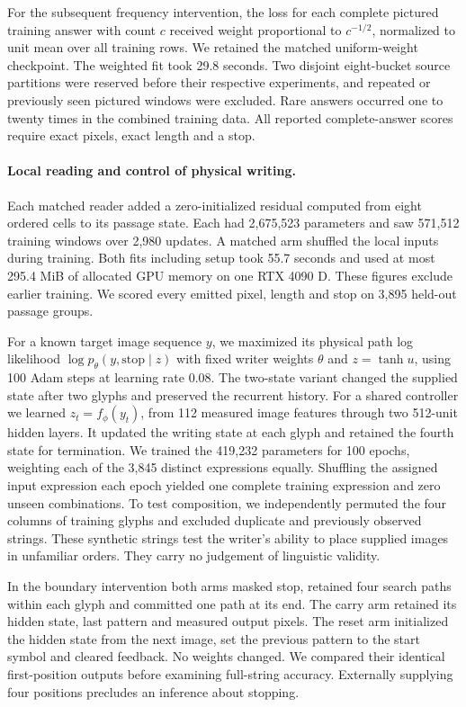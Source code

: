 \documentclass[12pt,a4paper]{article}
\providecommand{\DIFadd}[1]{{\protect\color{blue} \sf #1}} %
\begin{document}
\DIFadd{For the subsequent frequency intervention, the loss for each complete pictured training answer with count $c$ received weight proportional to $c^{-1/2}$, normalized to unit mean over all training rows. We retained the matched uniform-weight checkpoint. The weighted fit took 29.8 seconds. Two disjoint eight-bucket source partitions were reserved before their respective experiments, and repeated or previously seen pictured windows were excluded. Rare answers occurred one to twenty times in the combined training data. All reported complete-answer scores require exact pixels, exact length and a stop.
}

\paragraph{\DIFadd{Local reading and control of physical writing.}}
\DIFadd{Each matched reader added a zero-initialized residual computed from eight ordered cells to its passage state. Each had 2,675,523 parameters and saw 571,512 training windows over 2,980 updates. A matched arm shuffled the local inputs during training. Both fits including setup took 55.7 seconds and used at most 295.4 MiB of allocated GPU memory on one RTX 4090 D. These figures exclude earlier training. We scored every emitted pixel, length and stop on 3,895 held-out passage groups.
}

\DIFadd{For a known target image sequence $y$, we maximized its physical path log likelihood $\log p_\theta(y,\mathrm{stop}\mid z)$ with fixed writer weights $\theta$ and $z=\tanh u$, using 100 Adam steps at learning rate 0.08. The two-state variant changed the supplied state after two glyphs and preserved the recurrent history. For a shared controller we learned $z_t=f_\phi(y_t)$, from 112 measured image features through two 512-unit hidden layers. It updated the writing state at each glyph and retained the fourth state for termination. We trained the 419,232 parameters for 100 epochs, weighting each of the 3,845 distinct expressions equally. Shuffling the assigned input expression each epoch yielded one complete training expression and zero unseen combinations. To test composition, we independently permuted the four columns of training glyphs and excluded duplicate and previously observed strings. These synthetic strings test the writer's ability to place supplied images in unfamiliar orders. They carry no judgement of linguistic validity.
}

\DIFadd{In the boundary intervention both arms masked stop, retained four search paths within each glyph and committed one path at its end. The carry arm retained its hidden state, last pattern and measured output pixels. The reset arm initialized the hidden state from the next image, set the previous pattern to the start symbol and cleared feedback. No weights changed. We compared their identical first-position outputs before examining full-string accuracy. Externally supplying four positions precludes an inference about stopping.
}
\end{document}
